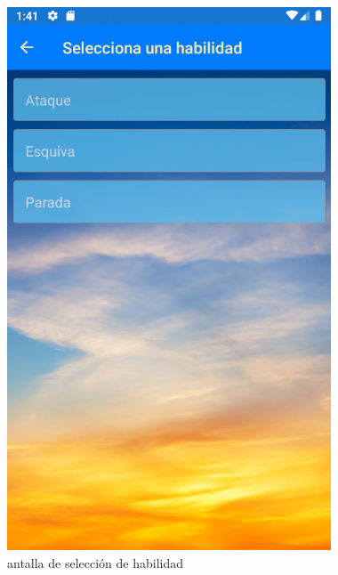 \begin{figure}[H]
    \centering
    \includegraphics[scale=0.7]{Figures/Capturas/SeleccionarHabilidad.png}
    \caption{antalla de selección de habilidad}
    \label{SeleccionHabilidad}    
\end{figure}

